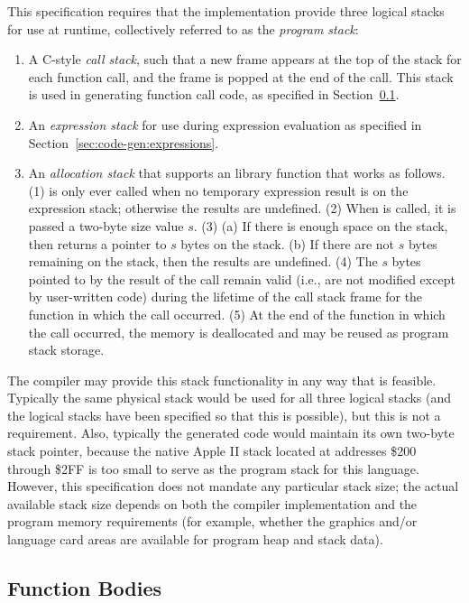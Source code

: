\documentclass[10pt]{article}
\begin{document}
This specification requires that the implementation provide three
logical stacks for use at runtime, collectively referred to as the
\emph{program stack}:
%
\begin{enumerate}
%
\item A C-style \emph{call stack}, such that a new frame appears at
  the top of the stack for each function call, and the frame is popped
  at the end of the call.  This stack is used in generating function
  call code, as specified in Section~\ref{sec:code-gen:fn-bodies}.
%
\item An \emph{expression stack} for use during expression evaluation
  as specified in Section~\ref{sec:code-gen:expressions}.
%
\item An \emph{allocation stack} that supports an 
  library function that works as follows.  (1)  is only
  ever called when no temporary expression result is on the expression
  stack; otherwise the results are undefined.  (2) When 
  is called, it is passed a two-byte size value $s$.  (3) (a) If there
  is enough space on the stack, then  returns a pointer
  to $s$ bytes on the stack. (b) If there are not $s$ bytes remaining
  on the stack, then the results are undefined. (4) The $s$ bytes
  pointed to by the result of the  call remain valid
  (i.e., are not modified except by user-written code) during the
  lifetime of the call stack frame for the function in which the
   call occurred.  (5) At the end of the function in
  which the  call occurred, the memory is deallocated
  and may be reused as program stack storage.
%
\end{enumerate}

The compiler may provide this stack functionality in any way that is
feasible.  Typically the same physical stack would be used for all
three logical stacks (and the logical stacks have been specified so
that this is possible), but this is not a requirement.  Also,
typically the generated code would maintain its own two-byte stack
pointer, because the native Apple II stack located at addresses \$200
through \$2FF is too small to serve as the program stack for this
language.  However, this specification does not mandate any particular
stack size; the actual available stack size depends on both the
compiler implementation and the program memory requirements (for
example, whether the graphics and/or language card areas are available
for program heap and stack data).

\subsection{Function Bodies}
\label{sec:code-gen:fn-bodies}
\end{document}

